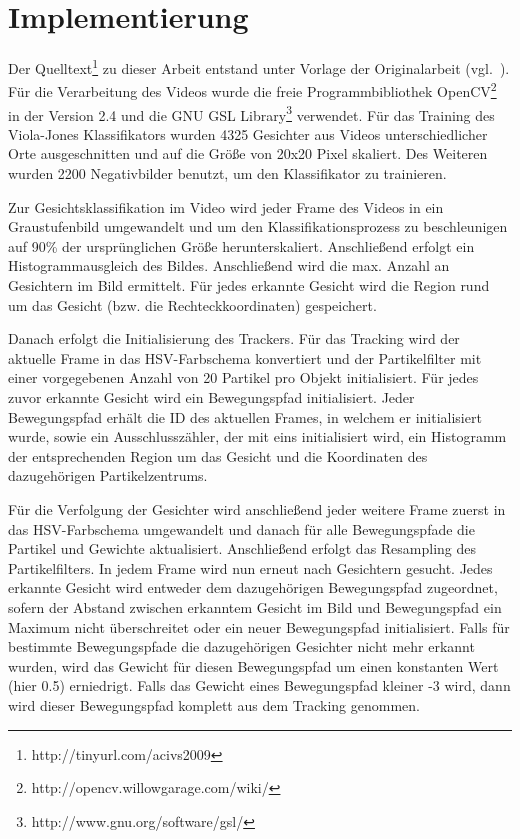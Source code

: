 \documentclass[a4paper, 11pt, twocolumn]{article}
\begin{document}

\section{Implementierung} %
\label{sec:implementierung}

Der Quelltext\footnote{http://tinyurl.com/acivs2009} zu dieser Arbeit entstand unter Vorlage der Originalarbeit (vgl.~\cite{aliMultipleHuman}). Für die Verarbeitung des Videos wurde die freie Programmbibliothek OpenCV\footnote{http://opencv.willowgarage.com/wiki/} in der Version 2.4 und die GNU GSL Library\footnote{http://www.gnu.org/software/gsl/} verwendet.
Für das Training des Viola-Jones Klassifikators wurden 4325 Gesichter aus Videos unterschiedlicher Orte ausgeschnitten und auf die Größe von 20x20 Pixel skaliert. Des Weiteren wurden 2200 Negativbilder benutzt, um den Klassifikator zu trainieren.

Zur Gesichtsklassifikation im Video wird jeder Frame des Videos in ein Graustufenbild umgewandelt und um den Klassifikationsprozess zu beschleunigen auf 90\% der ursprünglichen Größe herunterskaliert. Anschließend erfolgt ein Histogrammausgleich des Bildes. Anschließend wird die max. Anzahl an Gesichtern im Bild ermittelt. Für jedes erkannte Gesicht wird die Region rund um das Gesicht (bzw. die Rechteckkoordinaten) gespeichert.

Danach erfolgt die Initialisierung des Trackers. Für das Tracking wird der aktuelle Frame in das HSV-Farbschema konvertiert und der Partikelfilter mit einer vorgegebenen Anzahl von 20 Partikel pro Objekt initialisiert. Für jedes zuvor erkannte Gesicht wird ein Bewegungspfad initialisiert. Jeder Bewegungspfad erhält die ID des aktuellen Frames, in welchem er initialisiert wurde, sowie ein Ausschlusszähler, der mit eins initialisiert wird, ein Histogramm der entsprechenden Region um das Gesicht und die Koordinaten des dazugehörigen Partikelzentrums.

Für die Verfolgung der Gesichter wird anschließend jeder weitere Frame zuerst in das HSV-Farbschema umgewandelt und danach für alle Bewegungspfade die Partikel und Gewichte aktualisiert. Anschließend erfolgt das Resampling des Partikelfilters. In jedem Frame wird nun erneut nach Gesichtern gesucht. Jedes erkannte Gesicht wird entweder dem dazugehörigen Bewegungspfad zugeordnet, sofern der Abstand zwischen erkanntem Gesicht im Bild und Bewegungspfad ein Maximum nicht überschreitet oder ein neuer Bewegungspfad initialisiert. Falls für bestimmte Bewegungspfade die dazugehörigen Gesichter nicht mehr erkannt wurden, wird das Gewicht für diesen Bewegungspfad um einen konstanten Wert (hier 0.5) erniedrigt. Falls das Gewicht eines Bewegungspfad kleiner -3 wird, dann wird dieser Bewegungspfad komplett aus dem Tracking genommen.
\end{document}
